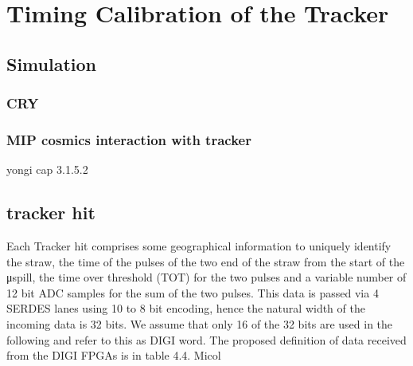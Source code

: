 \chapter{Timing Calibration of the Tracker}
\section{Simulation}
\subsection{CRY}
\subsection{MIP cosmics interaction with tracker}
yongi cap 3.1.5.2
\section{tracker hit}
Each Tracker hit comprises some geographical information to uniquely identify
the straw, the time of the pulses of the two end of the straw from the start of the
μspill, the time over threshold (TOT) for the two pulses and a variable number
of 12 bit ADC samples for the sum of the two pulses. This data is passed via 4
SERDES lanes using 10 to 8 bit encoding, hence the natural width of the incoming
data is 32 bits. We assume that only 16 of the 32 bits are used in the following
and refer to this as DIGI word. The proposed definition of data received from the
DIGI FPGAs is in table 4.4.
Micol 